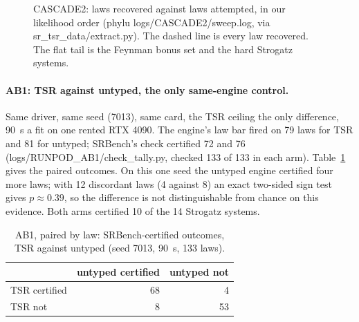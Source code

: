 \documentclass[sigconf,nonacm]{acmart}
\newcommand{\src}[1]{{\small\ttfamily #1}}
\begin{document}
\begin{figure}[t]
\centering
{}
\caption{CASCADE2: laws recovered against laws attempted, in our likelihood
order (\src{phylu logs/\allowbreak{}CASCADE2/\allowbreak{}sweep.\allowbreak{}log}, via
\src{sr\_\allowbreak{}tsr\_\allowbreak{}data/\allowbreak{}extract.\allowbreak{}py}). The dashed line is every law recovered. The
flat tail is the Feynman bonus set and the hard Strogatz systems.}
\label{fig:cascade}
\end{figure}

\paragraph{AB1: TSR against untyped, the only same-engine control.} Same
driver, same seed (7013), same card, the TSR ceiling the only difference, 90~s a
fit on one rented RTX 4090. The engine's law bar fired on 79 laws for TSR and 81
for untyped; SRBench's check certified 72 and 76
(\src{logs/\allowbreak{}RUNPOD\_\allowbreak{}AB1/\allowbreak{}check\_\allowbreak{}tally.\allowbreak{}py}, checked 133 of 133 in each arm).
Table~\ref{tab:ab1} gives the paired outcomes. On this one seed the untyped
engine certified four more laws; with 12 discordant laws (4 against 8) an exact
two-sided sign test gives $p\approx0.39$, so the difference is not
distinguishable from chance on this evidence. Both arms certified 10 of the 14
Strogatz systems.

\begin{table}[t]
\caption{AB1, paired by law: SRBench-certified outcomes, TSR against untyped
(seed 7013, 90~s, 133 laws).}
\label{tab:ab1}
\small
\begin{tabular}{@{}lrr@{}}
\toprule
 & untyped certified & untyped not \\
\midrule
TSR certified & 68 & 4 \\
TSR not & 8 & 53 \\
\bottomrule
\end{tabular}
\end{table}
\end{document}
